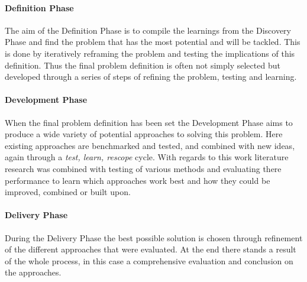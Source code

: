 \paragraph{Definition Phase}
\label{par:Definition Phase}
The aim of the Definition Phase is to compile the learnings from the Discovery Phase and find the problem that has the most potential and will be tackled. This is done by iteratively reframing the problem and testing the implications of this definition.
Thus the final problem definition is often not simply selected but developed through a series of steps of refining the problem, testing and learning.

\paragraph{Development Phase}
\label{par:Development Phase}
When the final problem definition has been set the Development Phase aims to produce a wide variety of potential approaches to solving this problem. Here existing approaches are benchmarked and tested, and combined with new ideas, again through a \emph{test, learn, rescope} cycle.
With regards to this work literature research was combined with testing of various methods and evaluating there performance to learn which approaches work best and how they could be improved, combined or built upon.

\paragraph{Delivery Phase}
\label{par:Delivery Phase}
During the Delivery Phase the best possible solution is chosen through refinement of the different approaches that were evaluated. At the end there stands a result of the whole process, in this case a comprehensive evaluation and conclusion on the approaches.


%
%
%
%
%
